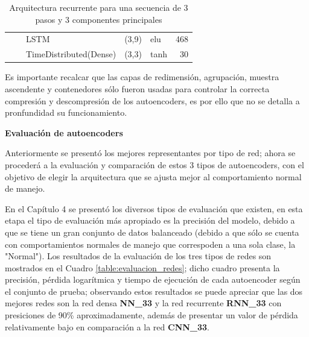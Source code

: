 \begin{table}[H]
\begin{center}
\begin{tabular}{ll|l|r|l|r|}
\multicolumn{1}{|l|}{}                              &                             & LSTM                               & (3,9)                                & elu                                     & 468                                         \\ \cline{3-6} 
\multicolumn{1}{|l|}{}                              &                             & TimeDistributed(Dense)             & (3,3)                                & tanh                                     & 30                                          \\ \hline
\end{tabular}
\end{center}
\caption{Arquitectura recurrente para una secuencia de 3 pasos y 3 componentes principales}
\label{table:rnn33}
\end{table}

Es importante recalcar que las capas de redimensi\'{o}n, agrupaci\'{o}n, muestra ascendente y contenedores s\'{o}lo fueron usadas para controlar la correcta compresi\'{o}n y descompresi\'{o}n de los autoencoders, es por ello que no se detalla a pronfundidad su funcionamiento.

\vspace{5mm} %

\textbf{Evaluaci\'{o}n de autoencoders}

\vspace{5mm} %

Anteriormente se present\'{o} los mejores representantes por tipo de red; ahora se proceder\'{a} a la evaluaci\'{o}n y comparaci\'{o}n de estos 3 tipos de autoencoders, con el objetivo de elegir la arquitectura que se ajusta mejor al comportamiento normal de manejo.

\vspace{5mm} %

En el Cap\'{i}tulo 4 se present\'{o} los diversos tipos de evaluaci\'{o}n que existen, en esta etapa el tipo de evaluaci\'{o}n m\'{a}s apropiado es la precisi\'{o}n del modelo, debido a que se tiene un gran conjunto de datos balanceado (debido a que s\'{o}lo se cuenta con comportamientos normales de manejo que correspoden a una sola clase, la "Normal"). Los resultados de la evaluaci\'{o}n de los tres tipos de redes son mostrados en el Cuadro \ref{table:evaluacion_redes}; dicho cuadro presenta la precisi\'{o}n, p\'{e}rdida logar\'{i}tmica y tiempo de ejecuci\'{o}n de cada autoencoder seg\'{u}n el conjunto de prueba; observando estos resultados se puede apreciar que las dos mejores redes son la red densa \textbf{NN\_33} y la red recurrente \textbf{RNN\_33} con presiciones de 90\% aproximadamente, adem\'{a}s de presentar un valor de p\'{e}rdida relativamente bajo en comparaci\'{o}n a la red \textbf{CNN\_33}.


